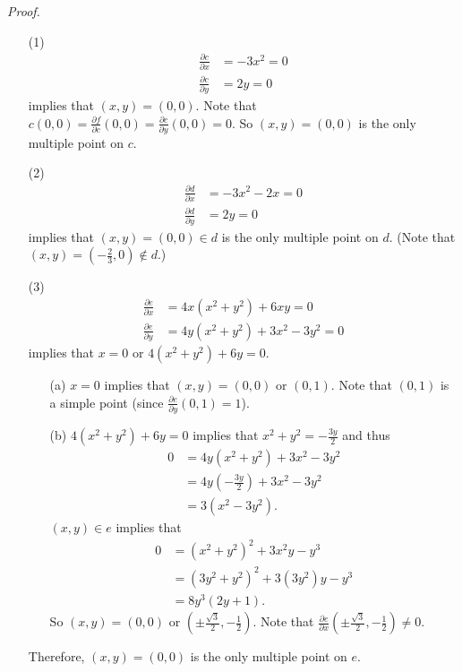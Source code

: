 \documentclass{article}
\begin{document}
\emph{Proof.}
\begin{enumerate}
\item[(1)]
  \begin{align*}
    \frac{\partial c}{\partial x} &= -3x^2 = 0 \\
    \frac{\partial c}{\partial y} &= 2y = 0
  \end{align*}
  implies that $(x,y) = (0,0)$.
  Note that
  $c(0,0) = \frac{\partial f}{\partial c}(0,0) = \frac{\partial c}{\partial y}(0,0) = 0$.
  So $(x,y) = (0,0)$ is the only multiple point on $c$.

\item[(2)]
  \begin{align*}
    \frac{\partial d}{\partial x} &= -3x^2 - 2x = 0 \\
    \frac{\partial d}{\partial y} &= 2y = 0
  \end{align*}
  implies that $(x,y) = (0,0) \in d$ is the only multiple point on $d$.
  (Note that $(x,y) = \left( -\frac{2}{3},0 \right) \not\in d$.)

\item[(3)]
  \begin{align*}
    \frac{\partial e}{\partial x} &= 4x(x^2+y^2) + 6xy = 0 \\
    \frac{\partial e}{\partial y} &= 4y(x^2+y^2) + 3x^2 - 3y^2 = 0
  \end{align*}
  implies that $x = 0$ or $4(x^2+y^2) + 6y = 0$.
  \begin{enumerate}
  \item[(a)]
    $x = 0$ implies that $(x,y) = (0,0)$ or $(0,1)$.
    Note that $(0,1)$ is a simple point (since $\frac{\partial e}{\partial y}(0,1) = 1$).
  \item[(b)]
    $4(x^2+y^2) + 6y = 0$ implies that $x^2+y^2 = -\frac{3y}{2}$ and thus
    \begin{align*}
      0
      &= 4y(x^2+y^2) + 3x^2 - 3y^2 \\
      &= 4y\left( -\frac{3y}{2} \right) + 3x^2 - 3y^2 \\
      &= 3(x^2 - 3y^2).
    \end{align*}
    $(x,y) \in e$ implies that
    \begin{align*}
      0
      &= (x^2+y^2)^2 + 3x^2y - y^3 \\
      &= (3y^2+y^2)^2 + 3(3y^2)y - y^3 \\
      &= 8y^3(2y+1).
    \end{align*}
    So $(x,y) = (0,0)$ or $\left( \pm\frac{\sqrt{3}}{2}, -\frac{1}{2} \right)$.
    Note that $\frac{\partial e}{\partial x}\left( \pm\frac{\sqrt{3}}{2}, -\frac{1}{2} \right) \neq 0$.
  \end{enumerate}
  Therefore, $(x,y) = (0,0)$ is the only multiple point on $e$.


\end{enumerate}
\end{document}
